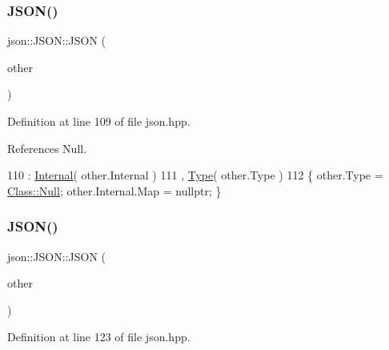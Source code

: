 \subsubsection{\texorpdfstring{J\+S\+O\+N()}{JSON()}\hspace{0.1cm}{\footnotesize\ttfamily [3/9]}}
{\footnotesize\ttfamily json\+::\+J\+S\+O\+N\+::\+J\+S\+ON (\begin{DoxyParamCaption}\item[{\mbox{\hyperlink{classjson_1_1_j_s_o_n}{J\+S\+ON}} \&\&}]{other }\end{DoxyParamCaption})\hspace{0.3cm}{\ttfamily [inline]}}



Definition at line 109 of file json.\+hpp.



References Null.


\begin{DoxyCode}
110             : \mbox{\hyperlink{classjson_1_1_j_s_o_n_a1e2a064794c3d55c8bb8887fc5734947}{Internal}}( other.Internal )
111             , \mbox{\hyperlink{classjson_1_1_j_s_o_n_a3fa6923afa41bdfe38077fbc0079aaf5}{Type}}( other.Type )
112         \{ other.Type = \mbox{\hyperlink{classjson_1_1_j_s_o_n_a762f55df6d407c1af61607ed516ffe07abbb93ef26e3c101ff11cdd21cab08a94}{Class::Null}}; other.Internal.Map = \textcolor{keyword}{nullptr}; \}
\end{DoxyCode}
\mbox{\label{classjson_1_1_j_s_o_n_ab147ef429a76d7087fcd7d60ea067405}} 
\subsubsection{\texorpdfstring{J\+S\+O\+N()}{JSON()}\hspace{0.1cm}{\footnotesize\ttfamily [4/9]}}
{\footnotesize\ttfamily json\+::\+J\+S\+O\+N\+::\+J\+S\+ON (\begin{DoxyParamCaption}\item[{const \mbox{\hyperlink{classjson_1_1_j_s_o_n}{J\+S\+ON}} \&}]{other }\end{DoxyParamCaption})\hspace{0.3cm}{\ttfamily [inline]}}



Definition at line 123 of file json.\+hpp.



